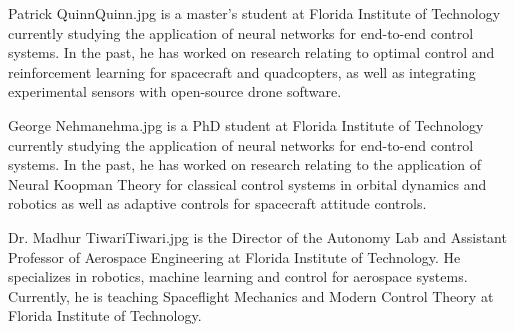 \documentclass[twocolumn,letterpaper]{IEEEAerospaceCLS}
\begin{document}



\thebiography
\begin{biographywithpic}
{Patrick Quinn}{Quinn.jpg}
is a master's student at Florida Institute of Technology currently studying the application of neural networks for end-to-end control systems. In the past, he has worked on research relating to optimal control and reinforcement learning for spacecraft and quadcopters, as well as integrating experimental sensors with open-source drone software.
\end{biographywithpic} 

\begin{biographywithpic}
{George Nehma}{nehma.jpg}
is a PhD student at Florida Institute of Technology currently studying the application of neural networks for end-to-end control systems. In the past, he has worked on research relating to the application of Neural Koopman Theory for classical control systems in orbital dynamics and robotics as well as adaptive controls for spacecraft attitude controls.
\end{biographywithpic} 

\begin{biographywithpic}
{Dr. Madhur Tiwari}{Tiwari.jpg}
is the Director of the Autonomy Lab and Assistant Professor of Aerospace Engineering at Florida Institute of Technology. He specializes in robotics, machine learning and control for aerospace systems. Currently, he is teaching Spaceflight Mechanics and Modern Control Theory at Florida Institute of Technology.

\end{biographywithpic}
\end{document}
